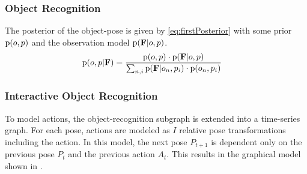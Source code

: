 %
%




 
\subsubsection{Object Recognition}            
            The posterior of the object-pose is given by \eqref{eq:firstPosterior} with some prior $\text{p}(o,p)$ and the observation model $\text{p}(\mathbf{F}|o,p)$.
            \begin{align}
                \label{eq:firstPosterior}
                \prob{o,p|\set{F}} &= \frac{\prob{o,p} \cdot \prob{\set{F}|o,p}}{\sum_{n,i} \prob{\set{F}|o_n,p_i}\cdot \prob{o_n,p_i}}                              
                \vspace{-2ex}
            \end{align}

        \subsubsection{Interactive Object Recognition}
            To model actions, the object-recognition subgraph is extended into a time-series graph. For each pose, actions are modeled as $I$ relative pose transformations including the  action. In this model, the next pose $P_{t+1}$ is dependent only on the previous pose $P_t$ and the previous action $A_t$. This results in the graphical model shown in .
            
